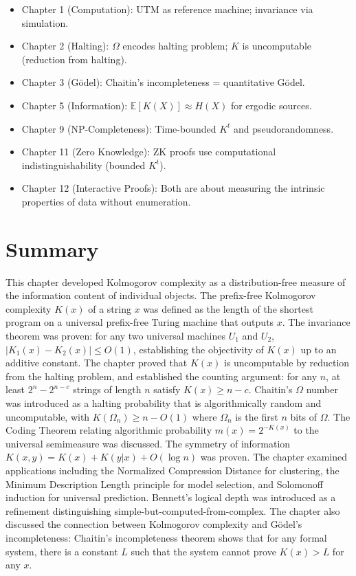\begin{itemize}
\item Chapter 1 (Computation): UTM as reference machine; invariance via simulation.
\item Chapter 2 (Halting): $\Omega$ encodes halting problem; $K$ is uncomputable (reduction from halting).
\item Chapter 3 (G\"odel): Chaitin's incompleteness = quantitative G\"odel.
\item Chapter 5 (Information): $\mathbb{E}[K(X)] \approx H(X)$ for ergodic sources.
\item Chapter 9 (NP-Completeness): Time-bounded $K^t$ and pseudorandomness.
\item Chapter 11 (Zero Knowledge): ZK proofs use computational indistinguishability (bounded $K^t$).
\item Chapter 12 (Interactive Proofs): Both are about measuring the intrinsic properties of data without enumeration.
\end{itemize}

\section{Summary}
\label{sec:kolmogorov:summary}

This chapter developed Kolmogorov complexity as a distribution-free measure of the information content of individual objects. The prefix-free Kolmogorov complexity $K(x)$ of a string $x$ was defined as the length of the shortest program on a universal prefix-free Turing machine that outputs $x$. The invariance theorem was proven: for any two universal machines $U_1$ and $U_2$, $|K_1(x) - K_2(x)| \leq O(1)$, establishing the objectivity of $K(x)$ up to an additive constant. The chapter proved that $K(x)$ is uncomputable by reduction from the halting problem, and established the counting argument: for any $n$, at least $2^n - 2^{n-c}$ strings of length $n$ satisfy $K(x) \geq n - c$. Chaitin's $\Omega$ number was introduced as a halting probability that is algorithmically random and uncomputable, with $K(\Omega_n) \geq n - O(1)$ where $\Omega_n$ is the first $n$ bits of $\Omega$. The Coding Theorem relating algorithmic probability $m(x) = 2^{-K(x)}$ to the universal semimeasure was discussed. The symmetry of information $K(x,y) = K(x) + K(y|x) + O(\log n)$ was proven. The chapter examined applications including the Normalized Compression Distance for clustering, the Minimum Description Length principle for model selection, and Solomonoff induction for universal prediction. Bennett's logical depth was introduced as a refinement distinguishing simple-but-computed-from-complex. The chapter also discussed the connection between Kolmogorov complexity and Gödel's incompleteness: Chaitin's incompleteness theorem shows that for any formal system, there is a constant $L$ such that the system cannot prove $K(x) > L$ for any $x$.

